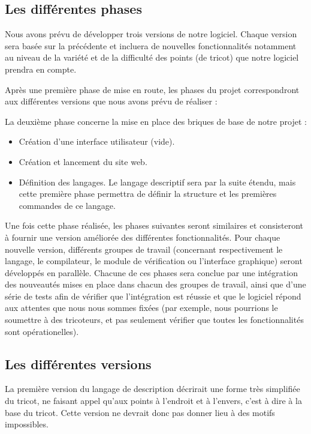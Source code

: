\documentclass{article}
\begin{document}
\subsection{Les différentes phases}

Nous avons prévu de développer trois versions de notre logiciel. Chaque version sera basée sur la précédente et incluera de nouvelles
fonctionnalités notamment au niveau de la variété et de la difficulté des points (de tricot) que notre logiciel prendra en compte. \newline

Après une première phase de mise en route, les phases du projet correspondront aux différentes versions que nous avons prévu de réaliser :

La deuxième phase concerne la mise en place des briques de base de notre projet :
    \begin{itemize}
     \item Création d'une interface utilisateur (vide).
     \item Création et lancement du site web.
     \item Définition des langages. Le langage descriptif sera par la suite étendu, mais cette première phase permettra de définir la
structure et les premières commandes de ce langage.
    \end{itemize}

Une fois cette phase réalisée, les phases suivantes seront similaires et consisteront à fournir une version améliorée des
différentes fonctionnalités. Pour chaque nouvelle version, différents groupes de travail (concernant respectivement le langage, le
compilateur, le module de vérification ou l'interface graphique) seront développés en parallèle. Chacune de ces phases sera conclue
par une intégration des nouveautés mises en place dans chacun des groupes de travail, ainsi que d'une série de tests afin de vérifier que
l'intégration est réussie et que le logiciel répond aux attentes que nous nous sommes fixées (par exemple, nous pourrions le soumettre
à des tricoteurs, et pas seulement vérifier que toutes les fonctionnalités sont opérationelles).


\subsection{Les différentes versions}

La première version du langage de description décrirait une forme très simplifiée du tricot, ne faisant appel qu'aux points à l'endroit
et à l'envers, c'est à dire à la base du tricot. Cette version ne devrait donc pas donner lieu à des motifs impossibles.
\end{document}
